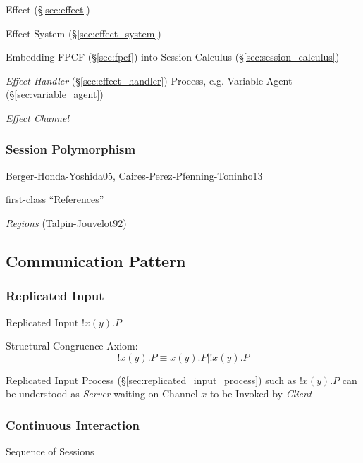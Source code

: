 Effect (\S\ref{sec:effect})

Effect System (\S\ref{sec:effect_system})

Embedding FPCF (\S\ref{sec:fpcf}) into Session Calculus
(\S\ref{sec:session_calculus})

\emph{Effect Handler} (\S\ref{sec:effect_handler}) Process, e.g.
Variable Agent (\S\ref{sec:variable_agent})

\emph{Effect Channel}



\subsubsection{Session Polymorphism}\label{sec:session_polymorphism}


Berger-Honda-Yoshida05, Caires-Perez-Pfenning-Toninho13

first-class ``References'' \cite{orchard-yoshida16}

\emph{Regions} (Talpin-Jouvelot92)



\subsection{Communication Pattern}\label{sec:communication_pattern}

\subsubsection{Replicated Input}\label{sec:replicated_input}

Replicated Input $!x(y).P$

Structural Congruence Axiom:
\[
  !x(y).P \equiv x(y).P | !x(y).P
\]

Replicated Input Process (\S\ref{sec:replicated_input_process}) such
as $!x(y).P$ can be understood as \emph{Server} waiting on Channel $x$
to be Invoked by \emph{Client}



\subsubsection{Continuous Interaction}\label{sec:continuous_interaction}

Sequence of Sessions



